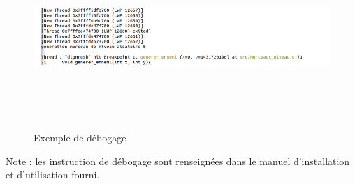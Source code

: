 \documentclass[a4paper,12pt]{article}
\begin{document}
\begin{figure}[h]
	\centering
	\includegraphics[height=7cm]{img/debug.png}
	\caption{Exemple de débogage}
	\label{débogage}
\end{figure}
Note : les instruction de débogage sont renseignées dans le manuel d'installation et d'utilisation fourni.
\end{document}
